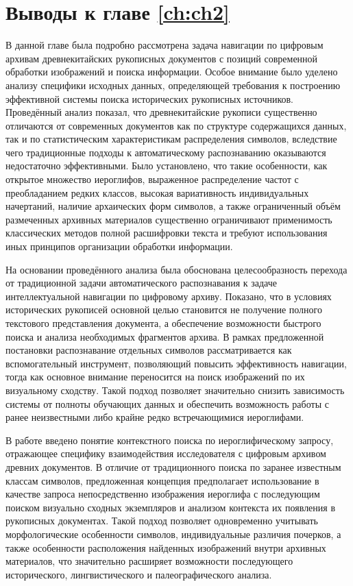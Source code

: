 \section{Выводы к главе \ref{ch:ch2}}
В данной главе была подробно рассмотрена задача навигации по цифровым архивам древнекитайских рукописных документов с позиций современной обработки изображений и поиска информации. Особое внимание было уделено анализу специфики исходных данных, определяющей требования к построению эффективной системы поиска исторических рукописных источников. Проведённый анализ показал, что древнекитайские рукописи существенно отличаются от современных документов как по структуре содержащихся данных, так и по статистическим характеристикам распределения символов, вследствие чего традиционные подходы к автоматическому распознаванию оказываются недостаточно эффективными. Было установлено, что такие особенности, как открытое множество иероглифов, выраженное распределение частот с преобладанием редких классов, высокая вариативность индивидуальных начертаний, наличие архаических форм символов, а также ограниченный объём размеченных архивных материалов существенно ограничивают применимость классических методов полной расшифровки текста и требуют использования иных принципов организации обработки информации.

На основании проведённого анализа была обоснована целесообразность перехода от традиционной задачи автоматического распознавания к задаче интеллектуальной навигации по цифровому архиву. Показано, что в условиях исторических рукописей основной целью становится не получение полного текстового представления документа, а обеспечение возможности быстрого поиска и анализа необходимых фрагментов архива. В рамках предложенной постановки распознавание отдельных символов рассматривается как вспомогательный инструмент, позволяющий повысить эффективность навигации, тогда как основное внимание переносится на поиск изображений по их визуальному сходству. Такой подход позволяет значительно снизить зависимость системы от полноты обучающих данных и обеспечить возможность работы с ранее неизвестными либо крайне редко встречающимися иероглифами.

В работе введено понятие контекстного поиска по иероглифическому запросу, отражающее специфику взаимодействия исследователя с цифровым архивом древних документов. В отличие от традиционного поиска по заранее известным классам символов, предложенная концепция предполагает использование в качестве запроса непосредственно изображения иероглифа с последующим поиском визуально сходных экземпляров и анализом контекста их появления в рукописных документах. Такой подход позволяет одновременно учитывать морфологические особенности символов, индивидуальные различия почерков, а также особенности расположения найденных изображений внутри архивных материалов, что значительно расширяет возможности последующего исторического, лингвистического и палеографического анализа.

